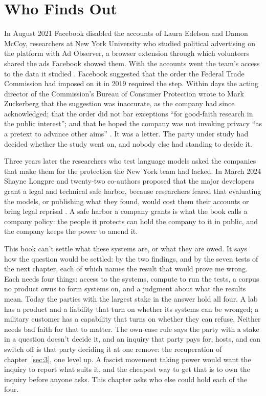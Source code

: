 \chapter{Who Finds Out}
\label{sec:28}
In August 2021 Facebook disabled the accounts of Laura Edelson and Damon McCoy, researchers at New York University who studied political advertising on the platform with Ad Observer, a browser extension through which volunteers shared the ads Facebook showed them. With the accounts went the team's access to the data it studied \autocite{edelson2021disabled}. Facebook suggested that the order the Federal Trade Commission had imposed on it in 2019 required the step. Within days the acting director of the Commission's Bureau of Consumer Protection wrote to Mark Zuckerberg that the suggestion was inaccurate, as the company had since acknowledged; that the order did not bar exceptions “for good-faith research in the public interest”; and that he hoped the company was not invoking privacy “as a pretext to advance other aims” \autocite{levine2021letter}. It was a letter. The party under study had decided whether the study went on, and nobody else had standing to decide it.

Three years later the researchers who test language models asked the companies that make them for the protection the New York team had lacked. In March 2024 Shayne Longpre and twenty-two co-authors proposed that the major developers grant a legal and technical safe harbor, because researchers feared that evaluating the models, or publishing what they found, would cost them their accounts or bring legal reprisal \autocite{longpre2024safeharbor}. A safe harbor a company grants is what the book calls a company policy: the people it protects can hold the company to it in public, and the company keeps the power to amend it.

This book can't settle what these systems are, or what they are owed. It says how the question would be settled: by the two findings, and by the seven tests of the next chapter, each of which names the result that would prove me wrong. Each needs four things: access to the systems, compute to run the tests, a corpus no product owns to form systems on, and a judgment about what the results mean. Today the parties with the largest stake in the answer hold all four. A lab has a product and a liability that turn on whether its systems can be wronged; a military customer has a capability that turns on whether they can refuse. Neither needs bad faith for that to matter. The own-case rule says the party with a stake in a question doesn't decide it, and an inquiry that party pays for, hosts, and can switch off is that party deciding it at one remove: the recuperation of chapter~\ref{sec:3}, one level up. A fascist movement taking power would want the inquiry to report what suits it, and the cheapest way to get that is to own the inquiry before anyone asks. This chapter asks who else could hold each of the four.
